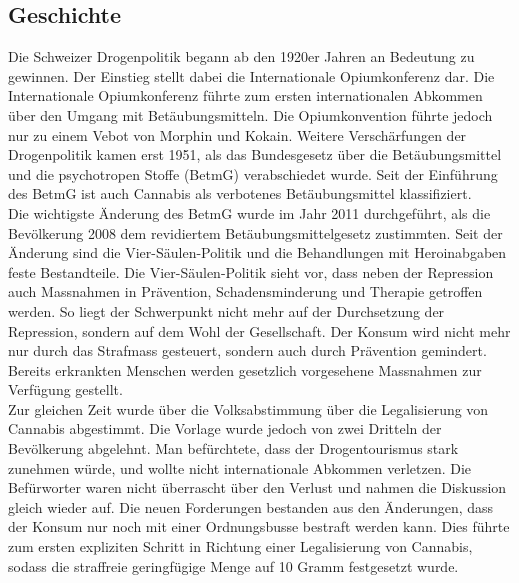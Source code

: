 \documentclass[../main.tex]{subfiles}
\begin{document}
	 
	 \subsection{Geschichte}
	 Die Schweizer Drogenpolitik begann ab den 1920er Jahren an Bedeutung zu gewinnen. 
	 Der Einstieg stellt dabei die Internationale Opiumkonferenz dar. 
	 Die Internationale Opiumkonferenz führte zum ersten internationalen Abkommen über den Umgang mit Betäubungsmitteln. 
	 Die Opiumkonvention führte jedoch nur zu einem Vebot von Morphin und Kokain. 
	 Weitere Verschärfungen der Drogenpolitik kamen erst 1951, als das Bundesgesetz über die Betäubungsmittel und die psychotropen Stoffe (BetmG) verabschiedet wurde.
	 Seit der Einführung des BetmG ist auch Cannabis als verbotenes Betäubungsmittel klassifiziert.\\	 
	 
	 \noindent
	 Die wichtigste Änderung des BetmG wurde im Jahr 2011 durchgeführt, als die Bevölkerung 2008 dem revidiertem Betäubungsmittelgesetz zustimmten. 
	 Seit der Änderung sind die Vier-Säulen-Politik und die Behandlungen mit Heroinabgaben feste Bestandteile. Die Vier-Säulen-Politik sieht vor, dass neben der Repression auch Massnahmen in Prävention, Schadensminderung und Therapie getroffen werden. 
	 So liegt der Schwerpunkt nicht mehr auf der Durchsetzung der Repression, sondern auf dem Wohl der Gesellschaft.
	 Der Konsum wird nicht mehr nur durch das Strafmass gesteuert, sondern auch durch Prävention gemindert. 
	 Bereits erkrankten Menschen werden gesetzlich vorgesehene Massnahmen zur Verfügung gestellt.\\
	 
	 \noindent
	 Zur gleichen Zeit wurde über die Volksabstimmung über die Legalisierung von Cannabis abgestimmt.
	 Die Vorlage wurde jedoch von zwei Dritteln der Bevölkerung abgelehnt.
	 Man befürchtete, dass der Drogentourismus stark zunehmen würde, und wollte nicht internationale Abkommen verletzen.
	 Die Befürworter waren nicht überrascht über den Verlust und nahmen die Diskussion gleich wieder auf. 
	 Die neuen Forderungen bestanden aus den Änderungen, dass der Konsum nur noch mit einer Ordnungsbusse bestraft werden kann. 
	 Dies führte zum ersten expliziten Schritt in Richtung einer Legalisierung von Cannabis, sodass die straffreie geringfügige Menge auf 10 Gramm festgesetzt wurde.
	 
	 
\end{document}
